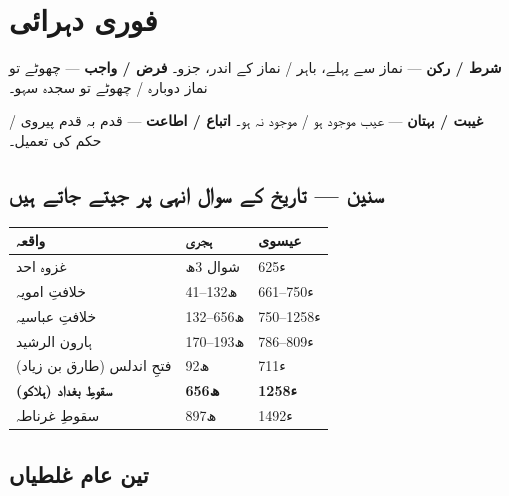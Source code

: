 \section*{فوری دہرائی}

\begin{nukta}
\textbf{شرط / رکن} --- نماز سے پہلے، باہر / نماز کے اندر، جزو۔ \quad
\textbf{فرض / واجب} --- چھوٹے تو نماز دوبارہ / چھوٹے تو سجدہ سہو۔

\smallskip
\textbf{غیبت / بہتان} --- عیب موجود ہو / موجود نہ ہو۔ \quad
\textbf{اتباع / اطاعت} --- قدم بہ قدم پیروی / حکم کی تعمیل۔
\end{nukta}

\medskip
\subsection*{سنین --- تاریخ کے سوال انہی پر جیتے جاتے ہیں}

\begin{center}
\begin{tabular}{@{}p{6.4cm} p{3.4cm} p{4.4cm}@{}}
\toprule
\textbf{واقعہ} & \textbf{ہجری} & \textbf{عیسوی} \\
\midrule
غزوہ احد                        & شوال \textenglish{3}ھ   & \textenglish{625}ء \\
خلافتِ امویہ                     & \textenglish{41--132}ھ  & \textenglish{661--750}ء \\
خلافتِ عباسیہ                    & \textenglish{132--656}ھ & \textenglish{750--1258}ء \\
ہارون الرشید                     & \textenglish{170--193}ھ & \textenglish{786--809}ء \\
فتحِ اندلس (طارق بن زیاد)        & \textenglish{92}ھ       & \textenglish{711}ء \\
\textbf{سقوطِ بغداد (ہلاکو)}     & \textbf{\textenglish{656}ھ} & \textbf{\textenglish{1258}ء} \\
سقوطِ غرناطہ                     & \textenglish{897}ھ      & \textenglish{1492}ء \\
\bottomrule
\end{tabular}
\end{center}

\subsection*{تین عام غلطیاں}

